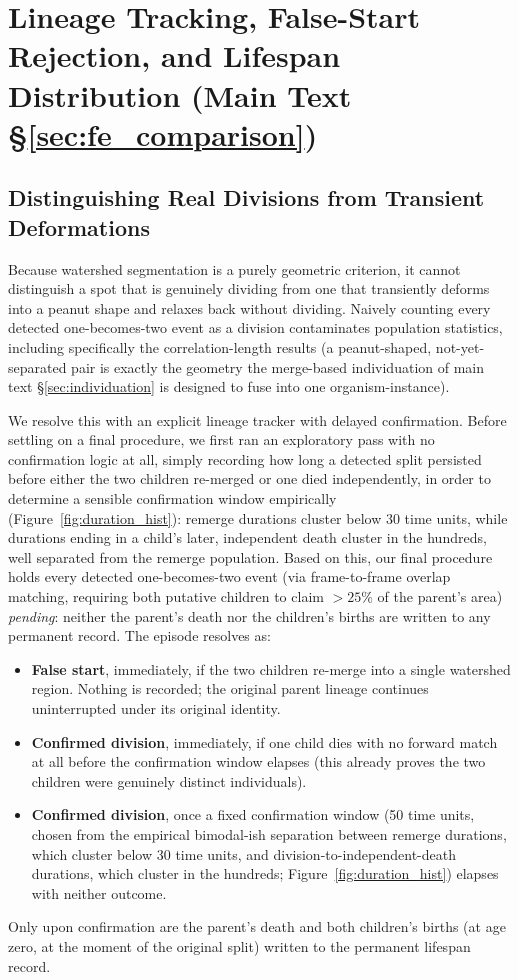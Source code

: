 \documentclass[11pt]{article}
\begin{document}
\section{Lineage Tracking, False-Start Rejection, and Lifespan Distribution (Main Text \S\ref{sec:fe_comparison})}
\label{sec:S_lineage}

\subsection{Distinguishing Real Divisions from Transient Deformations}
\label{sec:falsestarts}

Because watershed segmentation is a purely geometric criterion, it cannot distinguish a spot that is genuinely dividing from one that transiently deforms into a peanut shape and relaxes back without dividing. Naively counting every detected one-becomes-two event as a division contaminates population statistics, including specifically the correlation-length results (a peanut-shaped, not-yet-separated pair is exactly the geometry the merge-based individuation of main text \S\ref{sec:individuation} is designed to fuse into one organism-instance).

We resolve this with an explicit lineage tracker with delayed confirmation. Before settling on a final procedure, we first ran an exploratory pass with no confirmation logic at all, simply recording how long a detected split persisted before either the two children re-merged or one died independently, in order to determine a sensible confirmation window empirically (Figure~\ref{fig:duration_hist}): remerge durations cluster below 30 time units, while durations ending in a child's later, independent death cluster in the hundreds, well separated from the remerge population. Based on this, our final procedure holds every detected one-becomes-two event (via frame-to-frame overlap matching, requiring both putative children to claim $>25\%$ of the parent's area) \emph{pending}: neither the parent's death nor the children's births are written to any permanent record. The episode resolves as:
\begin{itemize}
\item \textbf{False start}, immediately, if the two children re-merge into a single watershed region. Nothing is recorded; the original parent lineage continues uninterrupted under its original identity.
\item \textbf{Confirmed division}, immediately, if one child dies with no forward match at all before the confirmation window elapses (this already proves the two children were genuinely distinct individuals).
\item \textbf{Confirmed division}, once a fixed confirmation window (50 time units, chosen from the empirical bimodal-ish separation between remerge durations, which cluster below 30 time units, and division-to-independent-death durations, which cluster in the hundreds; Figure~\ref{fig:duration_hist}) elapses with neither outcome.
\end{itemize}
Only upon confirmation are the parent's death and both children's births (at age zero, at the moment of the original split) written to the permanent lifespan record.
\end{document}
